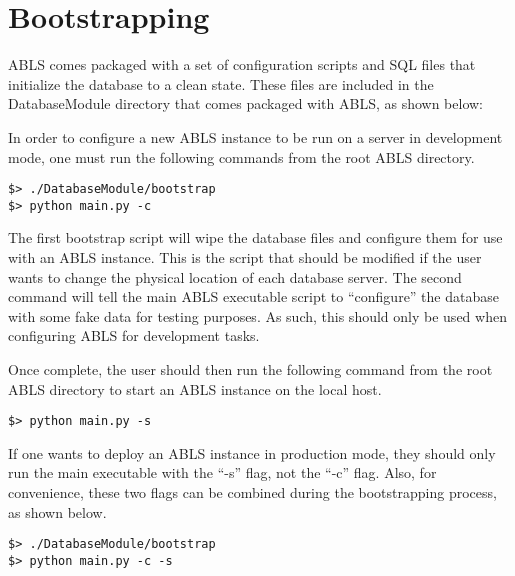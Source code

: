 \chapter{Bootstrapping}

ABLS comes packaged with a set of configuration scripts and SQL files that initialize
the database to a clean state. These files are included in the DatabaseModule directory
that comes packaged with ABLS, as shown below:


In order to configure a new ABLS instance to be run on a server in development mode, one must run
the following commands from the root ABLS directory.

\begin{lstlisting}
$> ./DatabaseModule/bootstrap 
$> python main.py -c 
\end{lstlisting}

The first bootstrap script will wipe the database files and configure them for use with an 
ABLS instance. This is the script that should be modified if the user wants to change the physical
location of each database server. The second command will tell the main ABLS executable
script to ``configure'' the database with some fake data for testing purposes. As such,
this should only be used when configuring ABLS for development tasks.

Once complete, the user should then run the following command from the root ABLS directory
to start an ABLS instance on the local host.

\begin{lstlisting}
$> python main.py -s
\end{lstlisting}

If one wants to deploy an ABLS instance in production mode, they should only run the main executable with the 
``-s'' flag, not the ``-c'' flag. Also, for convenience, these two flags can be combined during the bootstrapping
process, as shown below.

\begin{lstlisting}
$> ./DatabaseModule/bootstrap 
$> python main.py -c -s
\end{lstlisting}